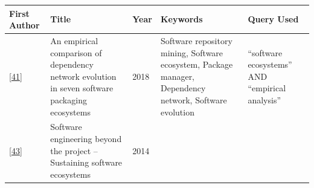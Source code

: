 \documentclass[]{book}
\begin{document}
\begin{longtable}[]{@{}lllll@{}}
\toprule
\begin{minipage}[b]{0.05\columnwidth}\raggedright\strut
First Author\strut
\end{minipage} & \begin{minipage}[b]{0.31\columnwidth}\raggedright\strut
Title\strut
\end{minipage} & \begin{minipage}[b]{0.02\columnwidth}\raggedright\strut
Year\strut
\end{minipage} & \begin{minipage}[b]{0.34\columnwidth}\raggedright\strut
Keywords\strut
\end{minipage} & \begin{minipage}[b]{0.13\columnwidth}\raggedright\strut
Query Used\strut
\end{minipage}\tabularnewline
\midrule
\endhead
\begin{minipage}[t]{0.05\columnwidth}\raggedright\strut
{[}\protect\hyperlink{ref-Decan2018}{41}{]}\strut
\end{minipage} & \begin{minipage}[t]{0.31\columnwidth}\raggedright\strut
An empirical comparison of dependency network evolution in seven
software packaging ecosystems\strut
\end{minipage} & \begin{minipage}[t]{0.02\columnwidth}\raggedright\strut
2018\strut
\end{minipage} & \begin{minipage}[t]{0.34\columnwidth}\raggedright\strut
Software repository mining, Software ecosystem, Package manager,
Dependency network, Software evolution\strut
\end{minipage} & \begin{minipage}[t]{0.13\columnwidth}\raggedright\strut
``software ecosystems'' AND ``empirical analysis''\strut
\end{minipage}\tabularnewline
\begin{minipage}[t]{0.05\columnwidth}\raggedright\strut
{[}\protect\hyperlink{ref-Dittrich2014}{43}{]}\strut
\end{minipage} & \begin{minipage}[t]{0.31\columnwidth}\raggedright\strut
Software engineering beyond the project -- Sustaining software
ecosystems\strut
\end{minipage} & \begin{minipage}[t]{0.02\columnwidth}\raggedright\strut
2014\strut

\end{minipage}
\end{longtable}
\end{document}
